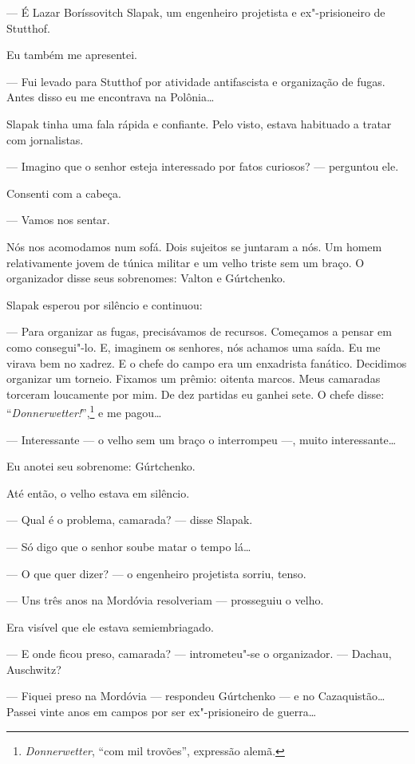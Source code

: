 --- É Lazar Boríssovitch Slapak, um engenheiro projetista e
ex"-prisioneiro de Stutthof.

Eu também me apresentei.

--- Fui levado para Stutthof por atividade antifascista e organização de
fugas. Antes disso eu me encontrava na Polônia\ldots{}

Slapak tinha uma fala rápida e confiante. Pelo visto, estava habituado a
tratar com jornalistas.

--- Imagino que o senhor esteja interessado por fatos curiosos? ---
perguntou ele.

Consenti com a cabeça.

--- Vamos nos sentar.

Nós nos acomodamos num sofá. Dois sujeitos se juntaram a nós. Um homem
relativamente jovem de túnica militar e um velho triste sem um braço. O
organizador disse seus sobrenomes: Valton e Gúrtchenko.

Slapak esperou por silêncio e continuou:

--- Para organizar as fugas, precisávamos de recursos. Começamos a
pensar em como consegui"-lo. E, imaginem os senhores, nós achamos uma
saída. Eu me virava bem no xadrez. E o chefe do campo era um enxadrista
fanático. Decidimos organizar um torneio. Fixamos um prêmio: oitenta
marcos. Meus camaradas torceram loucamente por mim. De dez partidas eu
ganhei sete. O chefe disse: ``\emph{Donnerwetter!}'',\footnote{\emph{Donnerwetter}, ``com
  mil trovões'', expressão alemã.} e me pagou\ldots{}

--- Interessante --- o velho sem um braço o interrompeu ---, muito
interessante\ldots{}

Eu anotei seu sobrenome: Gúrtchenko.

Até então, o velho estava em silêncio.

--- Qual é o problema, camarada? --- disse Slapak.

--- Só digo que o senhor soube matar o tempo lá\ldots{}

--- O que quer dizer? --- o engenheiro projetista sorriu, tenso.

--- Uns três anos na Mordóvia resolveriam --- prosseguiu o velho.

Era visível que ele estava semiembriagado.

--- E onde ficou preso, camarada? --- intrometeu"-se o organizador. ---
Dachau, Auschwitz?

--- Fiquei preso na Mordóvia --- respondeu Gúrtchenko --- e no
Cazaquistão\ldots{} Passei vinte anos em campos por ser ex"-prisioneiro de
guerra\ldots{}

